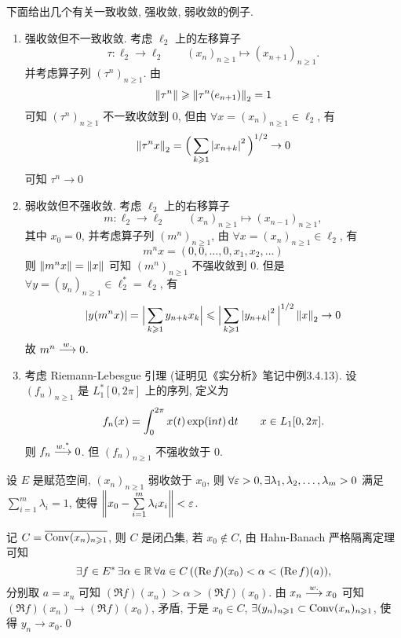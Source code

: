 \begin{Example}
	下面给出几个有关一致收敛, 强收敛, 弱收敛的例子.
	\begin{enumerate}[(1)]
		\item 强收敛但不一致收敛. 考虑 $ \ell_{2} $ 上的左移算子
		      \[
			      \tau: \ell_{2}\to\ell_{2}\qquad (x_{n})_{n\geqslant1}\mapsto (x_{n+1})_{n\geqslant1}.
		      \]
		      并考虑算子列 $ (\tau^{n})_{n\geqslant1} $. 由
		      \[
			      \norm{\tau^{n}}\geqslant\norm{\tau^{n}(e_{n+1})}_{2}=1
		      \]
		      可知 $ (\tau^{n})_{n\geqslant1} $ 不一致收敛到 0, 但由 $ \forall x=(x_{n})_{n\geqslant1}\in\ell_{2} $, 有
		      \[
			      \norm{\tau^{n}x}_{2} = \Big( \sum_{k\geqslant1}\abs{x_{n+k}}^{2} \Big)^{1/2}\to 0
		      \]
		      可知 $ \tau^{n}\to0 $
		\item  弱收敛但不强收敛. 考虑 $ \ell_{2} $ 上的右移算子
		      \[
			      m: \ell_{2}\to \ell_{2}\qquad (x_{n})_{n\geqslant1}\mapsto (x_{n-1})_{n\geqslant1},
		      \]
		      其中 $ x_{0}=0 $, 并考虑算子列 $ (m^{n})_{n\geqslant1} $, 由 $ \forall x=(x_{n})_{n\geqslant1}\in\ell_{2} $, 有
		      \[
			      m^{n}x=(0, 0, \dots, 0, x_{1}, x_{2}, \dots)
		      \]
		      则 $ \norm{m^{n}x}=\norm{x} $ 可知 $ (m^{n})_{n\geqslant1} $ 不强收敛到 0. 但是 $ \forall y=(y_{n})_{n\geqslant1}\in\ell_{2}^{*}=\ell_{2} $, 有
		      \[
			      \abs{y(m^{n}x)}=\Babs{\sum_{k\geqslant1}y_{n+k}x_{k}}\leqslant\Babs{\sum_{k\geqslant1}\abs{y_{n+k}}^{2}}^{1/2}\norm{x}_{2}\to 0
		      \]
		      故 $ m^{n}\weakto 0 $.
		\item 考虑 Riemann-Lebesgue 引理 (证明见《实分析》笔记中例3.4.13). 设 $ (f_{n})_{n\geqslant1} $ 是 $ L_{1}^{*}[0, 2\pi] $ 上的序列, 定义为
		      \[
			      f_{n}(x)=\int_{0}^{2\pi} x(t)\exp(\imag nt)\diff t\qquad x\in L_{1}[0, 2\pi].
		      \]
		      则 $ f_{n}\sweakto 0 $. 但 $ (f_{n})_{n\geqslant1} $ 不强收敛于 0.
	\end{enumerate}
\end{Example}
\begin{Theorem}[Mazur]
	设 $ E $ 是赋范空间, $ (x_{n})_{n\geqslant1} $ 弱收敛于 $ x_{0} $, 则 $ \forall \varepsilon>0, \exists\seq[m]{\lambda}>0 $ 满足 $ \sum\limits_{i=1}^{m}\lambda_{i}=1 $, 使得 $ \norm{x_{0}-\sum\limits_{i=1}^{m}\lambda_{i}x_{i}}<\varepsilon $.
\end{Theorem}

\begin{Proof}
	记 $ C = \baro{\conv(x_{n})_{n\geqslant1}} $, 则 $ C $ 是闭凸集, 若 $ x_{0}\notin C $, 由 Hahn-Banach 严格隔离定理可知
	\[
		\exists f\in\Star{E}\,\exists\alpha\in\R\,\forall a\in C\,((\Re f)(x_{0})<\alpha<(\Re f)(a)),
	\]
	分别取 $ a=x_{n} $ 可知 $ (\Re f)(x_{n})>\alpha>(\Re f)(x_{0}) $. 由 $ x_{n}\weakto x_{0} $ 可知 $ (\Re f)(x_{n})\to (\Re f)(x_{0}) $, 矛盾, 于是 $ x_{0}\in C $, $ \exists (y_{n})_{n\geqslant1}\subset\conv(x_{n})_{n\geqslant1} $, 使得 $ y_{n}\to x_{0} $.\qed
\end{Proof}

